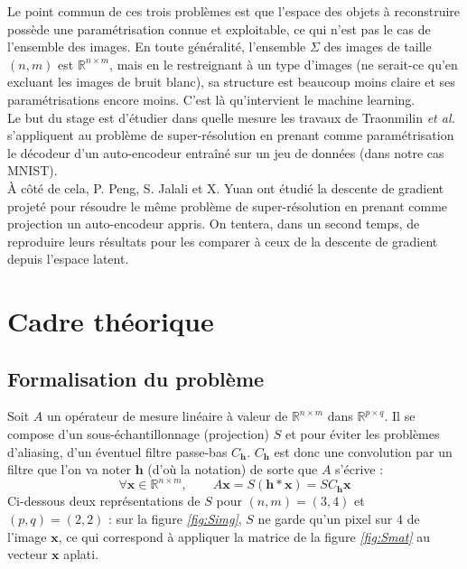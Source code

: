 \documentclass[hidelinks, french]{article} %
\newcommand{\R}{\mathbb{R}}
\newcommand{\etal}{\textit{et al. }}
\renewcommand{\bf}[1]{\boldsymbol{#1}}
\theoremstyle{enonce}
\theoremstyle{special}
\theoremstyle{rq}
\theoremstyle{exo}
\theoremstyle{demo}
\begin{document}
Le point commun de ces trois problèmes est que l'espace des objets à reconstruire possède une paramétrisation connue et exploitable, ce qui n'est pas le cas de l'ensemble des images. En toute généralité, l'ensemble $\Sigma$ des images de taille $(n,m)$ est $\R^{n\times m}$, mais en le restreignant à un type d'images (ne serait-ce qu'en excluant les images de bruit blanc), sa structure est beaucoup moins claire et ses paramétrisations encore moins. C'est là qu'intervient le machine learning.
\\

Le but du stage est d'étudier dans quelle mesure les travaux de Traonmilin \etal s'appliquent au problème de super-résolution en prenant comme paramétrisation le décodeur d'un auto-encodeur entraîné sur un jeu de données (dans notre cas MNIST).
\\
\`A côté de cela, P. Peng, S. Jalali et X. Yuan ont étudié la descente de gradient projeté pour résoudre le même problème de super-résolution en prenant comme projection un auto-encodeur appris. On tentera, dans un second temps, de reproduire leurs résultats pour les comparer à ceux de la descente de gradient depuis l'espace latent.
\\





\section{Cadre théorique}\label{sec:cadre theo}


\subsection{Formalisation du problème}\label{sec:forma2pb}

Soit $A$ un opérateur de mesure linéaire à valeur de $\R^{n\times m}$ dans $\R^{p\times q}$. Il se compose d'un sous-échantillonnage (projection) $S$ et pour éviter les problèmes d'aliasing, d'un éventuel filtre passe-bas $C_{\bf{h}}$. $C_{\bf{h}}$ est donc une convolution par un filtre que l'on va noter $\bf{h}$ (d'où la notation) de sorte que $A$ s'écrive :
\[\forall \bf{x}\in\R^{n\times m},\qquad A\bf{x}=S(\bf{h}*\bf{x})=SC_{\bf{h}}\bf{x}\]
Ci-dessous deux représentations de $S$ pour $(n,m)=(3, 4)$ et $(p,q)=(2, 2)$ : sur la figure \textit{\ref{fig:Simg}}, $S$ ne garde qu'un pixel sur 4 de l'image $\bf{x}$, ce qui correspond à appliquer la matrice de la figure \textit{\ref{fig:Smat}} au vecteur $\bf{x}$ aplati.
\end{document}
